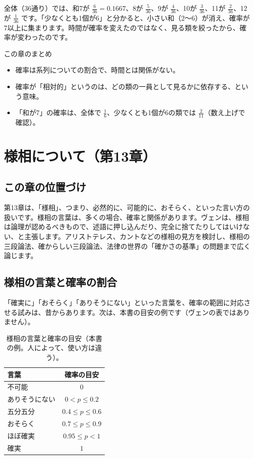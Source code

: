 \documentclass[a4paper,11pt,openany]{ltjsbook}
\begin{document}
全体（36通り）では、和7が $\tfrac6{36}=0.1667$、8が $\tfrac5{36}$、9が $\tfrac4{36}$、10が $\tfrac3{36}$、11が $\tfrac2{36}$、12が $\tfrac1{36}$ です。「少なくとも1個が6」と分かると、小さい和（2〜6）が消え、確率が7以上に集まります。時間が確率を変えたのではなく、見る類を絞ったから、確率が変わったのです。

\begin{pointbox}{この章のまとめ}
\begin{itemize}[leftmargin=*]
\item 確率は系列についての割合で、時間とは関係がない。
\item 確率が「相対的」というのは、どの類の一員として見るかに依存する、という意味。
\item 「和が7」の確率は、全体で $\tfrac16$、少なくとも1個が6の類では $\tfrac2{11}$（数え上げで確認）。
\end{itemize}
\end{pointbox}

\chapter{様相について（第13章）}

\section{この章の位置づけ}

第13章は、「様相」、つまり、必然的に、可能的に、おそらく、といった言い方の扱いです。様相の言葉は、多くの場合、確率と関係があります。ヴェンは、様相は論理が認めるべきもので、述語に押し込んだり、完全に捨てたりしてはいけない、と主張します。アリストテレス、カントなどの様相の見方を検討し、様相の三段論法、確からしい三段論法、法律の世界の「確かさの基準」の問題まで広く論じます。

\section{様相の言葉と確率の割合}

「確実に」「おそらく」「ありそうにない」といった言葉を、確率の範囲に対応させる試みは、昔からあります。次は、本書の目安の例です（ヴェンの表ではありません）。

\begin{table}[htbp]
\centering
\begin{tabular}{lc}
\toprule
言葉 & 確率の目安\\
\midrule
不可能 & $0$\\
ありそうにない & $0<p\le0.2$\\
五分五分 & $0.4\le p\le0.6$\\
おそらく & $0.7\le p\le0.9$\\
ほぼ確実 & $0.95\le p<1$\\
確実 & $1$\\
\bottomrule
\end{tabular}
\caption{様相の言葉と確率の目安（本書の例。人によって、使い方は違う）。}
\end{table}
\end{document}
